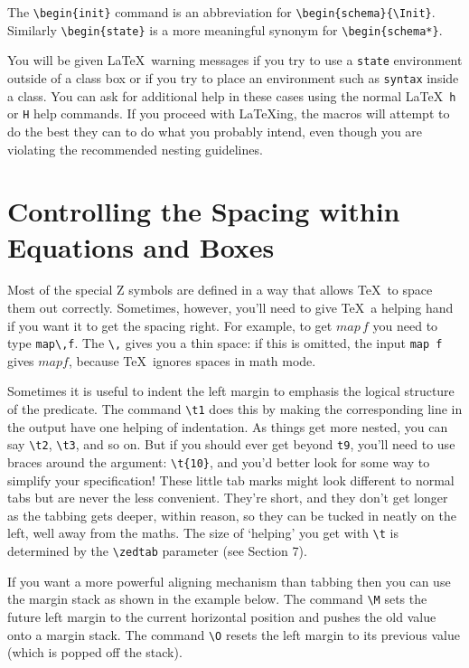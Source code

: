 \documentclass[a4paper]{article}
\begin{document}
The \verb|\begin{init}| command is an abbreviation for
\verb|\begin{schema}{\Init}|.  Similarly \verb|\begin{state}|
is a more meaningful synonym for \verb|\begin{schema*}|.

You will be given \LaTeX\ warning messages if you try to
use a \verb|state| environment outside of a class box
or if you try to place an environment such as \verb|syntax|
inside a class.  You can ask for additional help in these
cases using the normal \LaTeX\ \verb|h| or \verb|H| help commands.
If you proceed with \LaTeX ing, the macros will attempt to
do the best they can to do what you probably intend, even though
you are violating the recommended nesting guidelines.

\section{Controlling the Spacing within Equations and Boxes}

Most of the special Z symbols are defined
in a way that allows \TeX\ to space them out correctly.
Sometimes, however, you'll need to give \TeX\ a helping hand if
you want it to get the spacing right.  For example, to get $map\,f$
you need to type \verb|map\,f|.  The \verb|\,| gives you a thin space:
if this is omitted, the input \verb|map f| gives
$map f$, because \TeX\ ignores spaces in math mode.

Sometimes it is useful to indent the left margin to emphasis
the logical structure of the predicate.
The command \verb|\t1| does this by making the corresponding
line in the output have one helping of indentation.
As things get more nested, you can say \verb|\t2|, \verb|\t3|, and so on.
But if you should ever get beyond \verb|t9|, you'll need to use braces
around the argument: \verb|\t{10}|, and you'd better look for some way
to simplify your specification!
These little tab marks might look different to normal tabs
but are never the less convenient. They're short,
and they don't get longer as the tabbing gets deeper, within reason,
so they can be tucked in neatly on the left, well away from the maths.
The size of `helping' you get with \verb|\t| is determined by
the \verb|\zedtab| parameter (see Section 7).

If you want a more powerful aligning mechanism than tabbing
then you can use the margin stack as shown in the example below.
The command \verb|\M| sets the future left margin to the current
horizontal position and pushes the old value onto a margin stack.
The command \verb|\O| resets the left margin to its previous value
(which is popped off the stack).
\end{document}

